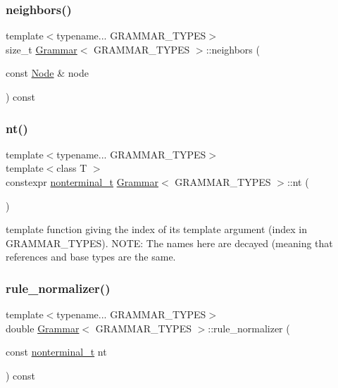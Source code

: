 \subsubsection{\texorpdfstring{neighbors()}{neighbors()}}
{\footnotesize\ttfamily template$<$typename... G\+R\+A\+M\+M\+A\+R\+\_\+\+T\+Y\+P\+ES$>$ \\
size\+\_\+t \hyperlink{class_grammar}{Grammar}$<$ G\+R\+A\+M\+M\+A\+R\+\_\+\+T\+Y\+P\+ES $>$\+::neighbors (\begin{DoxyParamCaption}\item[{const \hyperlink{class_node}{Node} \&}]{node }\end{DoxyParamCaption}) const\hspace{0.3cm}{\ttfamily [inline]}}

\mbox{\label{class_grammar_a047b55bfbd87c52e9d969af62c2932ab}} 
\subsubsection{\texorpdfstring{nt()}{nt()}}
{\footnotesize\ttfamily template$<$typename... G\+R\+A\+M\+M\+A\+R\+\_\+\+T\+Y\+P\+ES$>$ \\
template$<$class T $>$ \\
constexpr \hyperlink{_nonterminal_8h_a5c1f658dc7560600a16d22408bd716ca}{nonterminal\+\_\+t} \hyperlink{class_grammar}{Grammar}$<$ G\+R\+A\+M\+M\+A\+R\+\_\+\+T\+Y\+P\+ES $>$\+::nt (\begin{DoxyParamCaption}{ }\end{DoxyParamCaption})\hspace{0.3cm}{\ttfamily [inline]}}

template function giving the index of its template argument (index in G\+R\+A\+M\+M\+A\+R\+\_\+\+T\+Y\+P\+ES). N\+O\+TE\+: The names here are decayed (meaning that references and base types are the same.\mbox{\label{class_grammar_a240019987945a694e26bebcebcf463fc}} 
\subsubsection{\texorpdfstring{rule\+\_\+normalizer()}{rule\_normalizer()}}
{\footnotesize\ttfamily template$<$typename... G\+R\+A\+M\+M\+A\+R\+\_\+\+T\+Y\+P\+ES$>$ \\
double \hyperlink{class_grammar}{Grammar}$<$ G\+R\+A\+M\+M\+A\+R\+\_\+\+T\+Y\+P\+ES $>$\+::rule\+\_\+normalizer (\begin{DoxyParamCaption}\item[{const \hyperlink{_nonterminal_8h_a5c1f658dc7560600a16d22408bd716ca}{nonterminal\+\_\+t}}]{nt }\end{DoxyParamCaption}) const\hspace{0.3cm}{\ttfamily [inline]}}

